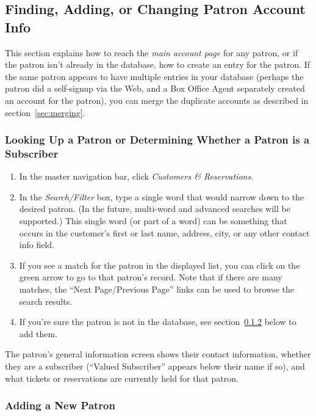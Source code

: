 \subsection{Finding,  Adding, or Changing Patron Account Info}
\label{sec:boa-admin}

This section explains how to reach the \emph{main account page} for any
patron, or if the patron isn't already in the database, how to create an
entry for the patron.  If the same patron appears to have multiple
entries in your database (perhaps the patron did a self-signup via the
Web, and a Box Office Agent separately created an account for the
patron), you can merge the duplicate accounts as described in
section~\ref{sec:merging}. 

\subsubsection{Looking Up a Patron or Determining Whether a Patron is a Subscriber}
\label{sec:lookup}

\begin{enumerate}
\item In the master navigation bar, click \emph{Customers \&
    Reservations}.
\item In the \emph{Search/Filter} box, type a single word that would
  narrow down to the desired patron.  (In the future, multi-word and
  advanced searches will be supported.)  This single word (or part of a
  word) can be something that occurs in the customer's first or last
  name, address, city, or any other contact info field.
\item If you see a match for the patron in the displayed list, you can
  click on the green arrow to go to that patron's record.  Note that if
  there are many matches, the ``Next Page/Previous Page'' links can be
  used to browse the search results.
\item If you're sure the patron is not in the database, see
  section~\ref{sec:addpatron} below to add them.
\end{enumerate}

The patron's general information screen shows their contact information,
whether they are a subscriber (``Valued Subscriber'' appears below their
name if so), and what tickets or reservations are currently held for
that patron.

\subsubsection{Adding a New Patron}
\label{sec:addpatron}

